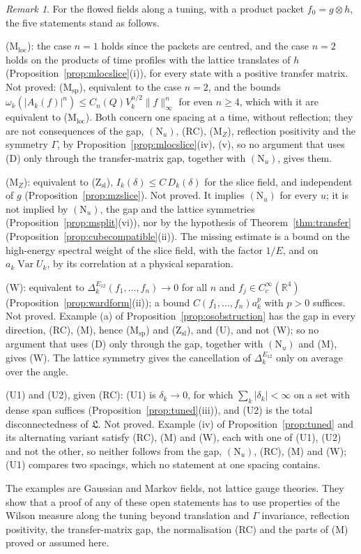 \documentclass[aps,prd,twocolumn,superscriptaddress,nofootinbib,longbibliography,floatfix,amsmath,amssymb,10pt]{revtex4-2}
\theoremstyle{definition}
\theoremstyle{remark}
\newtheorem{remark}[theorem]{Remark}
\newcommand{\R}{\mathbb{R}}
\newcommand{\Var}{\operatorname{Var}}
\begin{document}
\begin{remark}\label{rem:opensplit}
For the flowed fields along a tuning, with a product packet $f_0=g\otimes
h$, the five statements stand as follows.

(M$_{\mathrm{loc}}$): the case $n=1$ holds since the packets are centred,
and the case $n=2$ holds on the products of time profiles with the lattice
translates of $h$ (Proposition~\ref{prop:mlocslice}(i)), for every state with
a positive transfer matrix. Not proved: (M$_{\mathrm{sp}}$), equivalent to
the case $n=2$, and the bounds $\omega_k(|A_k(f)|^n)\le C_n(Q)V_k^{n/2}
\|f\|_\infty^n$ for even $n\ge4$, which with it are equivalent to
(M$_{\mathrm{loc}}$). Both concern one spacing at a time, without
reflection; they are not consequences of the gap, $(\mathrm N_u)$, (RC),
(M$_Z$), reflection positivity and the symmetry $\Gamma$, by
Proposition~\ref{prop:mlocslice}(iv), (v), so no argument that uses (D)
only through the transfer-matrix gap, together with $(\mathrm N_u)$, gives
them.

(M$_Z$): equivalent to (Z$_{\mathrm{sl}}$), $I_k(\delta)\le C\,D_k(\delta)$
for the slice field, and independent of $g$
(Proposition~\ref{prop:mzslice}). Not proved. It implies $(\mathrm N_u)$ for
every $u$; it is not implied by $(\mathrm N_u)$, the gap and the lattice
symmetries (Proposition~\ref{prop:msplit}(vi)), nor by the hypothesis of
Theorem~\ref{thm:transfer} (Proposition~\ref{prop:cubecompatible}(ii)). The
missing estimate is a bound on the high-energy spectral weight of the slice
field, with the factor $1/E$, and on $a_k\Var U_k$, by its correlation at a
physical separation.

(W): equivalent to $\Delta^{E_{12}}_k(f_1,\dots,f_n)\to0$ for all $n$ and
$f_j\in C^\infty_c(\R^4)$ (Proposition~\ref{prop:wardform}(ii)); a bound
$C(f_1,\dots,f_n)a_k^p$ with $p>0$ suffices. Not proved. Example (a) of
Proposition~\ref{prop:osobstruction} has the gap in every direction, (RC),
(M), hence (M$_{\mathrm{sp}}$) and (Z$_{\mathrm{sl}}$), and (U), and not
(W); so no argument that uses (D) only through the gap, together with
$(\mathrm N_u)$ and (M), gives (W). The lattice
symmetry gives the cancellation of $\Delta^{E_{12}}_k$ only on average over
the angle.

(U1) and (U2), given (RC): (U1) is $\delta_k\to0$, for which
$\sum_k|\delta_k|<\infty$ on a set with dense span suffices
(Proposition~\ref{prop:tuned}(iii)), and (U2) is the total disconnectedness
of $\mathfrak L$. Not proved. Example (iv) of Proposition~\ref{prop:tuned}
and its alternating variant satisfy (RC), (M) and (W), each with one of
(U1), (U2) and not the other, so neither follows from the gap,
$(\mathrm N_u)$, (RC), (M) and (W); (U1) compares two spacings, which no
statement at one spacing contains.

The examples are Gaussian and Markov fields, not lattice gauge theories. They
show that a proof of any of these open statements has to use properties
of the Wilson measure along the tuning beyond translation and $\Gamma$
invariance, reflection positivity, the transfer-matrix gap, the
normalisation (RC) and the parts of (M) proved or assumed here.
\end{remark}
\end{document}
